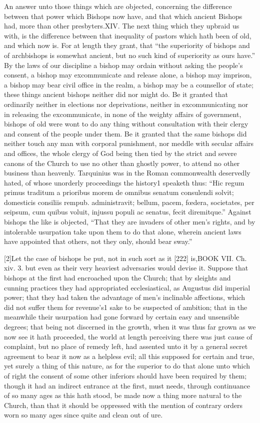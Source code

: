 An answer unto those things which are objected, concerning the difference between that power which Bishops now have, and that which ancient Bishops had, more than other presbyters.XIV. The next thing which they upbraid us with, is the difference between that inequality of pastors which hath been of old, and which now is. For at length they grant, that “the superiority of bishops and of archbishops is somewhat ancient, but no such kind of superiority as ours have.” By the laws of our discipline a bishop may ordain without asking the people’s consent, a bishop may excommunicate and release alone, a bishop may imprison, a bishop may bear civil office in the realm, a bishop may be a counsellor of state; these things ancient bishops neither did nor might do. Be it granted that ordinarily neither in elections nor deprivations, neither in excommunicating nor in releasing the excommunicate, in none of the weighty affairs of government, bishops of old were wont to do any thing without consultation with their clergy and consent of the people under them. Be it granted that the same bishops did neither touch any man with corporal punishment, nor meddle with secular affairs and offices, the whole clergy of God being then tied by the strict and severe canons of the Church to use no other than ghostly power, to attend no other business than heavenly. Tarquinius was in the Roman commonwealth deservedly hated, of whose unorderly proceedings the history1 speaketh thus: “Hic regum primus traditum a prioribus morem de omnibus senatum consulendi solvit; domesticis consiliis rempub. administravit; bellum, pacem, fœdera, societates, per seipsum, cum quibus voluit, injussu populi ac senatus, fecit diremitque.” Against bishops the like is objected, “That they are invaders of other men’s rights, and by intolerable usurpation take upon them to do that alone, wherein ancient laws have appointed that others, not they only, should bear sway.”

[2]Let the case of bishops be put, not in such sort as it [222] is,BOOK VII. Ch. xiv. 3. but even as their very heaviest adversaries would devise it. Suppose that bishops at the first had encroached upon the Church; that by sleights and cunning practices they had appropriated ecclesiastical, as Augustus did imperial power; that they had taken the advantage of men’s inclinable affections, which did not suffer them for revenue’s1 sake to be suspected of ambition; that in the meanwhile their usurpation had gone forward by certain easy and unsensible degrees; that being not discerned in the growth, when it was thus far grown as we now see it hath proceeded, the world at length perceiving there was just cause of complaint, but no place of remedy left, had assented unto it by a general secret agreement to bear it now as a helpless evil; all this supposed for certain and true, yet surely a thing of this nature, as for the superior to do that alone unto which of right the consent of some other inferiors should have been required by them; though it had an indirect entrance at the first, must needs, through continuance of so many ages as this hath stood, be made now a thing more natural to the Church, than that it should be oppressed with the mention of contrary orders worn so many ages since quite and clean out of ure.

